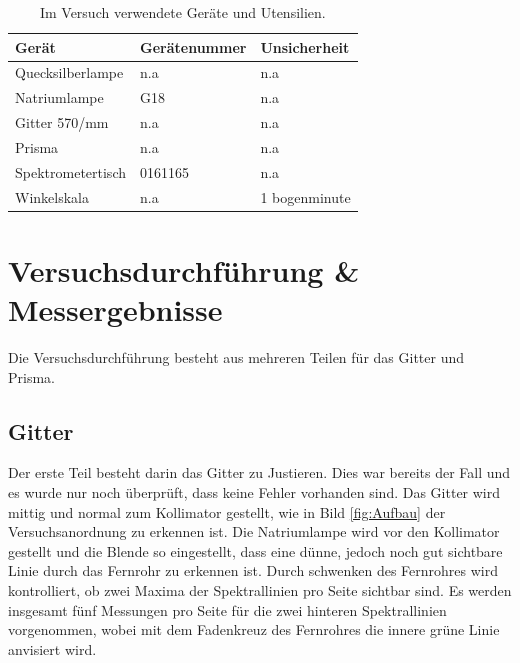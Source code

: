 \documentclass[12pt,a4paper,twoside]{article}
\begin{document}
    \begin{table}[H]
        \centering
        \caption{Im Versuch verwendete Geräte und Utensilien.}
        \label{tab:geraete}
        \begin{tabular}{| l | l | l |}
            \hline
            Gerät  & Gerätenummer  & Unsicherheit \\
            \hline
            Quecksilberlampe & {n.a} & {n.a} \\
            Natriumlampe & G18 & {n.a} \\
            Gitter 570/mm & {n.a} & {n.a} \\
            Prisma & {n.a} & {n.a} \\
            Spektrometertisch & 0161165 & {n.a} \\
            Winkelskala & {n.a} & 1 bogenminute \\
            \hline
        \end{tabular}
    \end{table}


\section{Versuchsdurchführung \& Messergebnisse} %
Die Versuchsdurchführung besteht aus mehreren Teilen für das Gitter und Prisma. 

\subsection{Gitter}

Der erste Teil besteht darin das Gitter zu Justieren. Dies war bereits der Fall und es wurde nur noch überprüft, dass keine Fehler vorhanden sind. Das Gitter wird mittig und normal zum Kollimator gestellt, wie in Bild \ref{fig:Aufbau} der Versuchsanordnung zu erkennen ist. 
Die Natriumlampe wird vor den Kollimator gestellt und die Blende so eingestellt, dass eine dünne, jedoch noch gut sichtbare Linie durch das Fernrohr zu erkennen ist. 
Durch schwenken des Fernrohres wird kontrolliert, ob zwei Maxima der Spektrallinien pro Seite sichtbar sind. 
Es werden insgesamt fünf Messungen pro Seite für die zwei hinteren Spektrallinien vorgenommen, wobei mit dem Fadenkreuz des Fernrohres die innere grüne Linie anvisiert wird. 
\end{document}
